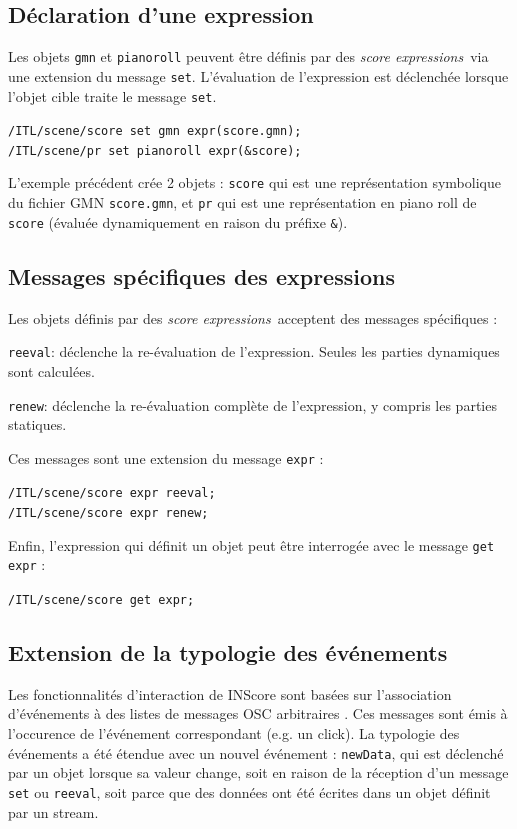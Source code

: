 \documentclass{article}
\newcommand{\OSC}[1]	{{\fontsize{10pt}{10pt} \selectfont\texttt{#1}}}
\newcommand{\sExprs}{\emph{score expressions}}
\let\olditemize\itemize
\let\oldenditemize\enditemize
\renewenvironment{itemize} 	{\olditemize \setlength{\itemsep}{1mm}}{\oldenditemize}
\newcommand{\sample}	[1]			{\vspace{-0.2em}\begin{center}\colorbox{mygrey}{\begin{minipage}[t]{0.97\columnwidth} {\small \texttt{#1}}\end{minipage}}\end{center}}
\begin{document}
\subsection{Déclaration d'une expression}
\label{declaringExpr}
Les objets \OSC{gmn} et \OSC{pianoroll} peuvent être définis par des \sExprs\ via une extension du message \OSC{set}.
L'évaluation de l'expression est déclenchée lorsque l'objet cible traite le message \OSC{set}.

\sample{/ITL/scene/score set gmn expr(score.gmn); \\
/ITL/scene/pr set pianoroll expr(\&score);
}

L'exemple précédent crée 2 objets : \OSC{score} qui est une représentation symbolique du fichier GMN \OSC{score.gmn}, et \OSC{pr} qui est une représentation en piano roll de \OSC{score} (évaluée dynamiquement en raison du préfixe  \OSC{\&}).


\subsection{Messages spécifiques des expressions}
\label{exprMsgs}
Les objets définis par des \sExprs\ acceptent des messages spécifiques :
\begin{itemize}
\item \OSC{reeval}: déclenche la re-évaluation de l'expression. Seules les parties dynamiques sont calculées.
\item \OSC{renew}: déclenche la re-évaluation complète de l'expression, y compris les parties statiques. 
\end{itemize}

Ces messages sont une extension du message \OSC{expr} :
\sample{/ITL/scene/score expr reeval; \\
/ITL/scene/score expr renew;
}

Enfin, l'expression qui définit un objet peut être interrogée avec le message \OSC{get expr} :
\sample{/ITL/scene/score get expr;}

\subsection{Extension de la typologie des événements}
\label{exprEvents}

Les fonctionnalités d'interaction de INScore sont basées sur l'association d'événements à des listes de messages OSC arbitraires \cite{Fober:13b}. Ces messages sont émis à l'occurence de l'événement correspondant (e.g. un click).
La typologie des événements a été étendue avec un nouvel événement : \OSC{newData}, qui est déclenché par un objet lorsque sa valeur change, soit en raison de la réception d'un message \OSC{set} ou \OSC{reeval}, soit parce que des données ont été écrites dans un objet définit par un stream.
\end{document}
